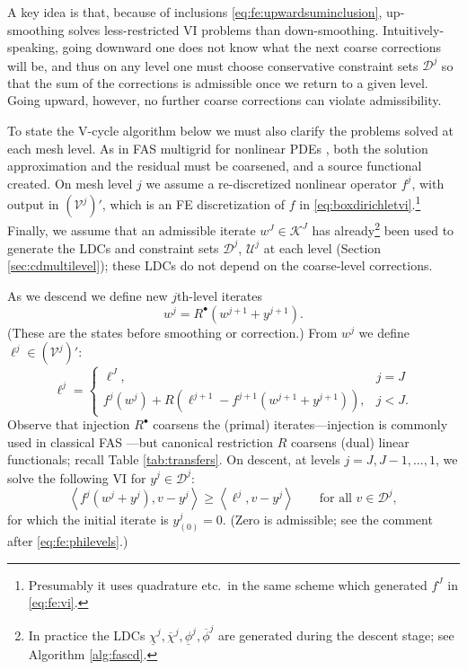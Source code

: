 \documentclass[review,hidelinks,onefignum,onetabnum]{siamart220329}
\newcommand{\cV}{\mathcal{V}}
\newcommand{\ip}[2]{\left<#1,#2\right>}
\newcommand{\iR}{R^{\bullet}}
\begin{document}
A key idea is that, because of inclusions \eqref{eq:fe:upwardsuminclusion}, up-smoothing solves less-restricted VI problems than down-smoothing.  Intuitively-speaking, going downward one does not know what the next coarse corrections will be, and thus on any level one must choose conservative constraint sets $\mathcal{D}^j$ so that the sum of the corrections is admissible once we return to a given level.  Going upward, however, no further coarse corrections can violate admissibility.

To state the V-cycle algorithm below we must also clarify the problems solved at each mesh level.  As in FAS multigrid for nonlinear PDEs \cite{BrandtLivne2011,Bruneetal2015,Trottenbergetal2001}, both the solution approximation and the residual must be coarsened, and a source functional created.  On mesh level $j$ we assume a re-discretized nonlinear operator $f^j$, with output in $(\cV^j)'$, which is an FE discretization of $f$ in \eqref{eq:boxdirichletvi}.\footnote{Presumably it uses quadrature etc.~in the same scheme which generated $f^J$ in \eqref{eq:fe:vi}.}  Finally, we assume that an admissible iterate $w^J \in \mathcal{K}^J$ has already\footnote{In practice the LDCs $\underline{\chi}^j,\overline{\chi}^j,\underline{\phi}^j,\overline{\phi}^j$ are generated during the descent stage; see Algorithm \ref{alg:fascd}.} been used to generate the LDCs and constraint sets $\mathcal{D}^j$, $\mathcal{U}^j$ at each level (Section \ref{sec:cdmultilevel}); these LDCs do not depend on the coarse-level corrections.

As we descend we define new $j$th-level iterates
\begin{equation}
w^j = \iR(w^{j+1} + y^{j+1}).  \label{eq:fe:definew}
\end{equation}
(These are the states before smoothing or correction.)  From $w^j$ we define $\ell^j \in (\cV^j)'$:
\begin{equation}
\ell^j = \begin{cases} \ell^J, & j=J \\
                       f^j(w^j) + R\left(\ell^{j+1}-f^{j+1}(w^{j+1}+y^{j+1})\right), & j<J. \end{cases} \label{eq:fe:levelsource}
\end{equation}
Observe that injection $\iR$ coarsens the (primal) iterates---injection is commonly used in classical FAS \cite[section 5.3]{Trottenbergetal2001}---but canonical restriction $R$ coarsens (dual) linear functionals; recall Table \ref{tab:transfers}.  On descent, at levels $j=J,J-1,\dots,1$, we solve the following VI for $y^j \in \mathcal{D}^j$:
\begin{equation}
\ip{f^j(w^j + y^j)}{v-y^j} \ge \ip{\ell^j}{v-y^j} \qquad \text{for all } v\in \mathcal{D}^j, \label{eq:fe:downvi}
\end{equation}
for which the initial iterate is $y_{(0)}^j=0$.  (Zero is admissible; see the comment after \eqref{eq:fe:philevels}.)
\end{document}
